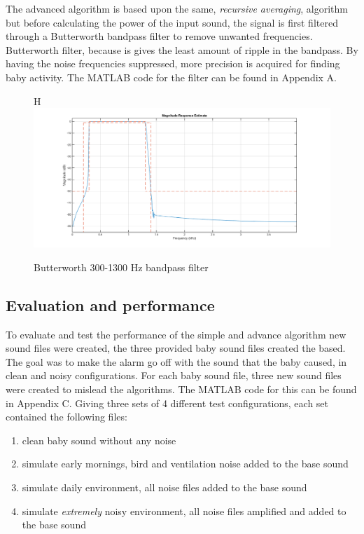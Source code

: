 The advanced algorithm is based upon the same, \emph{recursive averaging}, algorithm but before calculating
the power of the input sound, the signal is first filtered through a Butterworth bandpass filter to remove unwanted 
frequencies. Butterworth filter, because is gives the least amount of ripple in the bandpass. By having the noise frequencies suppressed, 
more precision is acquired for finding baby activity. The MATLAB code for the filter can be found in Appendix A.

\begin{figure}{H}
  \centering
  \includegraphics[width=1\textwidth]{sections/butt_pass_est.png}
  \caption{Butterworth 300-1300 Hz bandpass filter}
  \label{fig:butt_pass}
\end{figure}

\subsection{Evaluation and performance}
To evaluate and test the performance of the simple and advance algorithm new sound files were created, the three provided
baby sound files created the based. The goal was to make the alarm go off with the sound that the baby caused, in clean and noisy configurations. 
For each baby sound file, three new sound files were created to mislead the algorithms. The MATLAB code for this can be found in Appendix C.
Giving three sets of 4 different test configurations, each set contained the following files: 

\begin{enumerate}
  \item clean baby sound without any noise
  \item simulate early mornings, bird and ventilation noise added to the base sound
  \item simulate daily environment, all noise files added to the base sound
  \item simulate \emph{extremely} noisy environment, all noise files amplified and added to the base sound
\end{enumerate}

